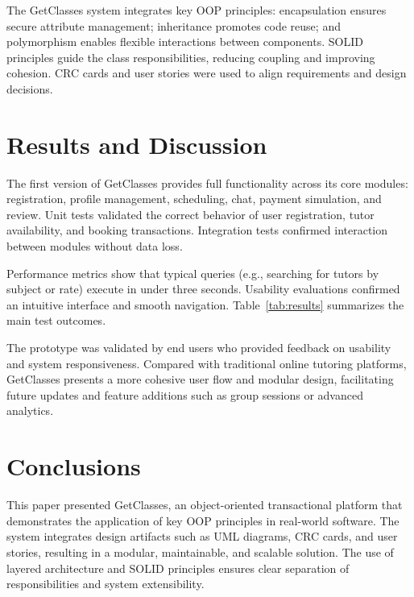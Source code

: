 \documentclass[conference]{IEEEtran}
\begin{document}
The GetClasses system integrates key OOP principles: encapsulation ensures secure attribute management; inheritance promotes code reuse; and polymorphism enables flexible interactions between components. SOLID principles guide the class responsibilities, reducing coupling and improving cohesion. CRC cards and user stories were used to align requirements and design decisions.

\section{Results and Discussion}
The first version of GetClasses provides full functionality across its core modules: registration, profile management, scheduling, chat, payment simulation, and review. Unit tests validated the correct behavior of user registration, tutor availability, and booking transactions. Integration tests confirmed interaction between modules without data loss.

Performance metrics show that typical queries (e.g., searching for tutors by subject or rate) execute in under three seconds. Usability evaluations confirmed an intuitive interface and smooth navigation. Table~\ref{tab:results} summarizes the main test outcomes.

\begin{table}[H]
\centering
\caption{Summary of functional testing results}
\label{tab:results}
\end{table}


The prototype was validated by end users who provided feedback on usability and system responsiveness. Compared with traditional online tutoring platforms, GetClasses presents a more cohesive user flow and modular design, facilitating future updates and feature additions such as group sessions or advanced analytics.

\section{Conclusions}
This paper presented GetClasses, an object-oriented transactional platform that demonstrates the application of key OOP principles in real-world software. The system integrates design artifacts such as UML diagrams, CRC cards, and user stories, resulting in a modular, maintainable, and scalable solution. The use of layered architecture and SOLID principles ensures clear separation of responsibilities and system extensibility.
\end{document}
